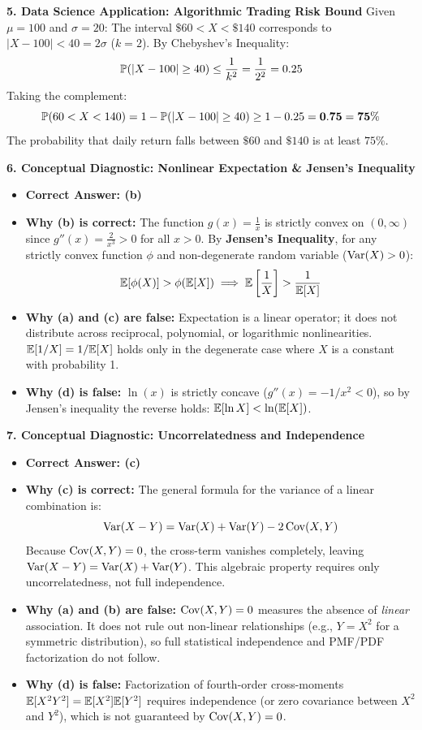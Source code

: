 \textbf{5. Data Science Application: Algorithmic Trading Risk Bound}
Given $\mu = 100$ and $\sigma = 20$:
The interval $\$60 < X < \$140$ corresponds to $|X - 100| < 40 = 2\sigma$ ($k = 2$).
By Chebyshev's Inequality:
$$\P(|X - 100| \ge 40) \le \frac{1}{k^2} = \frac{1}{2^2} = 0.25$$
Taking the complement:
$$\P(60 < X < 140) = 1 - \P(|X - 100| \ge 40) \ge 1 - 0.25 = \mathbf{0.75 = 75\%}$$
The probability that daily return falls between $\$60$ and $\$140$ is at least $75\%$.

\textbf{6. Conceptual Diagnostic: Nonlinear Expectation \& Jensen's Inequality}
\begin{itemize}
    \item \textbf{Correct Answer: (b)}
    \item \textbf{Why (b) is correct:} The function $g(x) = \frac{1}{x}$ is strictly convex on $(0, \infty)$ since $g''(x) = \frac{2}{x^3} > 0$ for all $x > 0$. By \textbf{Jensen's Inequality}, for any strictly convex function $\phi$ and non-degenerate random variable ($\Var(X) > 0$):
    $$\E[\phi(X)] > \phi(\E[X]) \implies \E\left[\frac{1}{X}\right] > \frac{1}{\E[X]}$$
    \item \textbf{Why (a) and (c) are false:} Expectation is a linear operator; it does not distribute across reciprocal, polynomial, or logarithmic nonlinearities. $\E[1/X] = 1/\E[X]$ holds only in the degenerate case where $X$ is a constant with probability 1.
    \item \textbf{Why (d) is false:} $\ln(x)$ is strictly concave ($g''(x) = -1/x^2 < 0$), so by Jensen's inequality the reverse holds: $\E[\ln X] < \ln(\E[X])$.
\end{itemize}

\textbf{7. Conceptual Diagnostic: Uncorrelatedness and Independence}
\begin{itemize}
    \item \textbf{Correct Answer: (c)}
    \item \textbf{Why (c) is correct:} The general formula for the variance of a linear combination is:
    $$\Var(X - Y) = \Var(X) + \Var(Y) - 2\Cov(X, Y)$$
    Because $\Cov(X, Y) = 0$, the cross-term vanishes completely, leaving $\Var(X - Y) = \Var(X) + \Var(Y)$. This algebraic property requires only uncorrelatedness, not full independence.
    \item \textbf{Why (a) and (b) are false:} $\Cov(X, Y) = 0$ measures the absence of \emph{linear} association. It does not rule out non-linear relationships (e.g., $Y = X^2$ for a symmetric distribution), so full statistical independence and PMF/PDF factorization do not follow.
    \item \textbf{Why (d) is false:} Factorization of fourth-order cross-moments $\E[X^2 Y^2] = \E[X^2]\E[Y^2]$ requires independence (or zero covariance between $X^2$ and $Y^2$), which is not guaranteed by $\Cov(X, Y) = 0$.
\end{itemize}

